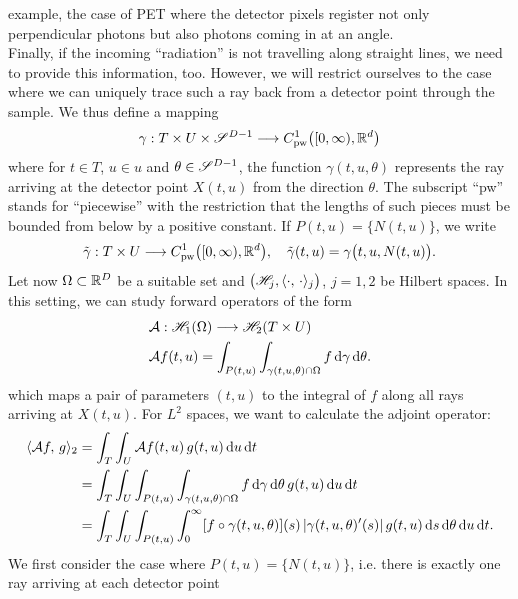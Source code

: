 \documentclass{amsart}
\begin{document}
example, the case of PET where the detector pixels register not only perpendicular photons but also photons coming in at an angle.\\[1ex]
%
%
Finally, if the incoming ``radiation'' is not travelling along straight lines, we need to provide this information, too. However, we will 
restrict ourselves to the case where we can uniquely trace such a ray back from a detector point through the sample. We thus define a 
mapping
%
\begin{equation}
 \gamma: T \times U \times \mathscr{S}^{D-1} \longrightarrow C_{\mathrm{pw}}^1\big([0,\infty), {\mathbb{R}}^d\big)
\end{equation} 
%
where for $t \in T$, $u \in u$ and $\theta \in \mathscr{S}^{D-1}$, the function $\gamma(t, u, \theta)$ represents the ray arriving at the 
detector point $X(t, u)$ from the direction $\theta$. The subscript ``pw'' stands for ``piecewise'' with the restriction that the lengths 
of such pieces must be bounded from below by a positive constant.  If $P(t,u) = \lbrace N(t,u)\rbrace$, we write 
%
\begin{equation}
 \tilde \gamma: T \times U \longrightarrow C_{\mathrm{pw}}^1\big([0,\infty), {\mathbb{R}}^d\big),\quad \tilde \gamma(t,u) = \gamma\big(t, u, N(t,u)\big).
\end{equation}
%
%
Let now $\Omega \subset {\ensuremath{\mathbb{R}}}^D$ be a suitable set and $\big({\mathscr{H}}_j, \langle \cdot,\,\cdot\rangle_j\big)$, $j=1,2$ be Hilbert spaces. In this 
setting, we can study forward operators of the form
%
\begin{align}
 & {\mathcal{A}}: {\mathscr{H}}_1(\Omega) \longrightarrow {\ensuremath{\mathscr{H}}}_2(T \times U) \\
 & {\mathcal{A}} f(t, u) = \int_{P(t, u)} \int_{\gamma(t, u, \theta) \cap \Omega} f \, \mathrm{d} \gamma\, \mathrm{d} \theta.
\end{align}
%
which maps a pair of parameters $(t, u)$ to the integral of $f$ along all rays arriving at $X(t, u)$. For $L^2$ spaces, we want to 
calculate the adjoint operator:
%
\begin{align}
 \langle {\ensuremath{\mathcal{A}}} f,\,g\rangle_2 
 &= \int_T \int_U {\mathcal{A}} f(t, u)\, g(t, u)\, \mathrm{d} u\, \mathrm{d} t \notag \\
 &= \int_T \int_U \int_{P(t, u)} \int_{\gamma(t, u, \theta) \cap \Omega} f \, \mathrm{d} \gamma\, \mathrm{d} \theta\, g(t, u)\, \mathrm{d} u\, \mathrm{d} t \notag \\
 \label{eq:adj_calculation_step1}
 &= \int_T \int_U \int_{P(t, u)} \int_0^\infty  [f \circ \gamma(t, u, \theta)](s)\, |\gamma(t, u, \theta)'(s)|\, g(t, u)\, \mathrm{d} s\, 
 \mathrm{d} \theta\, \mathrm{d} u\, \mathrm{d} t.
\end{align}
%
We first consider the case where $P(t,u) = \lbrace N(t,u)\rbrace$, i.e. there is exactly one ray arriving at each detector point 
\end{document}
